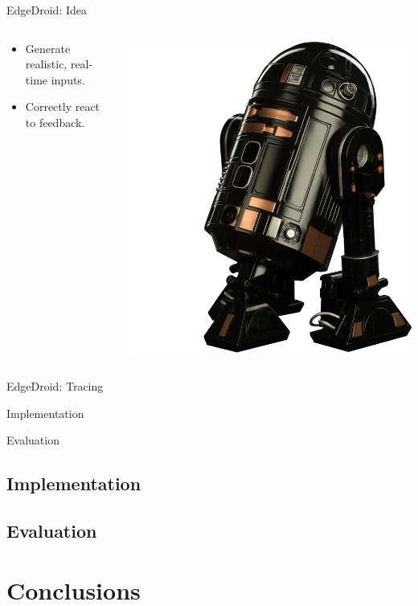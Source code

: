 \documentclass[aspectratio=1610]{beamer}
\begin{document}
\begin{frame}{EdgeDroid: Idea}
    \begin{columns}[onlytextwidth]
        \begin{column}{.5\linewidth}
            \begin{itemize}
                \itemsep2em
                \item Generate realistic, real-time inputs.
                \item Correctly react to feedback.
            \end{itemize}
        \end{column}%
        \begin{column}{.5\linewidth}
            \centering%
            \includegraphics[width=.7\linewidth]{img/astromech.png}
        \end{column}
    \end{columns}
\end{frame}

\begin{frame}{EdgeDroid: Tracing}
    
\end{frame}

\begin{frame}{Implementation}

\end{frame}

\begin{frame}{Evaluation}

\end{frame}


\subsection{Implementation}
\subsection{Evaluation}
\section{Conclusions}
\end{document}
